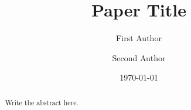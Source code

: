 \title{Paper Title}

\author{First Author}
\author{Second Author}

\date{\today}

\begin{abstract}
Write the abstract here.
\end{abstract}

\maketitle
